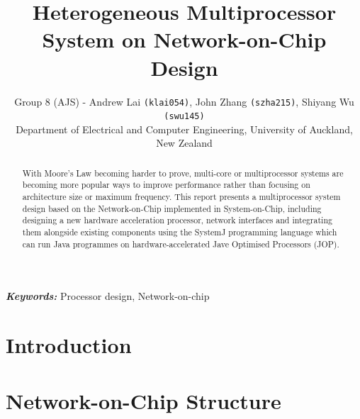 \documentclass[]{article}
\providecommand{\keywords}[1]{\textbf{\textit{Keywords:}} #1}
\begin{document}
	
	\begin{titlepage}
		
	\end{titlepage}
	
	\setcounter{page}{2}
	
	\title{\huge \textbf{Heterogeneous Multiprocessor System on Network-on-Chip Design}}
	\author{Group 8 (AJS) - Andrew Lai \texttt{(klai054)}, John Zhang \texttt{(szha215)}, Shiyang Wu \texttt{(swu145)} \\Department of Electrical and Computer Engineering, University of Auckland, New Zealand}
	
	\maketitle
	
	\begin{abstract}
		With Moore’s Law becoming harder to prove, multi-core or multiprocessor systems are becoming more popular ways to improve performance rather than focusing on architecture size or maximum frequency. This report presents a multiprocessor system design based on the Network-on-Chip implemented in System-on-Chip, including designing a new hardware acceleration processor, network interfaces and integrating them alongside existing components using the SystemJ programming language which can run Java programmes on hardware-accelerated Jave Optimised Processors (JOP).
	\end{abstract}
	
	
	\keywords{Processor design, Network-on-chip}
	
	\section{Introduction}
	
	
	
	\section{Network-on-Chip Structure}
	
\end{document}
